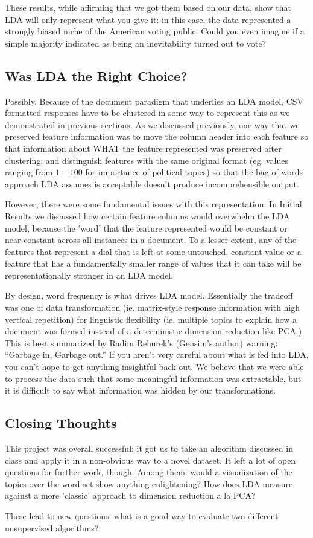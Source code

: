 These results, while affirming that we got them based on our data, show that LDA will only represent what you give it: in this case, the data represented a strongly biased niche of the American voting public. Could you even imagine if a simple majority indicated as being an inevitability turned out to vote?

\subsection{Was LDA the Right Choice?}
Possibly. Because of the document paradigm that underlies an LDA model, CSV formatted responses have to be clustered in some way to represent this as we demonstrated in previous sections. As we discussed previously, one way that we preserved feature information was to move the column header into each feature so that information about WHAT the feature represented was preserved after clustering, and distinguish features with the same original format (eg. values ranging from $1 - 100$ for importance of political topics) so that the bag of words approach LDA assumes is acceptable doesn't produce incomprehensible output.

However, there were some fundamental issues with this representation. In Initial Results we discussed how certain feature columns would overwhelm the LDA model, because the 'word' that the feature represented would be constant or near-constant across all instances in a document. To a lesser extent, any of the features that represent a dial that is left at some untouched, constant value or a feature that has a fundamentally smaller range of values that it can take will be representationally stronger in an LDA model.

By design, word frequency is what drives LDA model. Essentially the tradeoff was one of data transformation (ie. matrix-style response information with high vertical repetition) for linguistic flexibility (ie. multiple topics to explain how a document was formed instead of a deterministic dimension reduction like PCA.)\\

This is best summarized by Radim Rehurek's (Gensim's author) warning: ``Garbage in, Garbage out.'' If you aren't very careful about what is fed into LDA, you can't hope to get anything insightful back out. We believe that we were able to process the data such that some meaningful information was extractable, but it is difficult to say what information was hidden by our transformations.


\subsection{Closing Thoughts}
This project was overall successful: it got us to take an algorithm discussed in class and apply it in a non-obvious way to a novel dataset. It left a lot of open questions for further work, though. Among them: would a visualization of the topics over the word set show anything enlightening? How does LDA measure against a more 'classic' approach to dimension reduction a la PCA?

These lead to new questions: what is a good way to evaluate two different unsupervised algorithms?